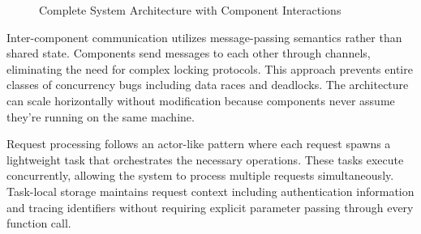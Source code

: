 \documentclass[12pt,a4paper,twoside]{report}
\begin{document}
\begin{figure}[p]
\caption{Complete System Architecture with Component Interactions}
\label{fig:complete-architecture}
\end{figure}

Inter-component communication utilizes message-passing semantics rather than shared state. Components send messages to each other through channels, eliminating the need for complex locking protocols. This approach prevents entire classes of concurrency bugs including data races and deadlocks. The architecture can scale horizontally without modification because components never assume they're running on the same machine.

Request processing follows an actor-like pattern where each request spawns a lightweight task that orchestrates the necessary operations. These tasks execute concurrently, allowing the system to process multiple requests simultaneously. Task-local storage maintains request context including authentication information and tracing identifiers without requiring explicit parameter passing through every function call.
\end{document}
